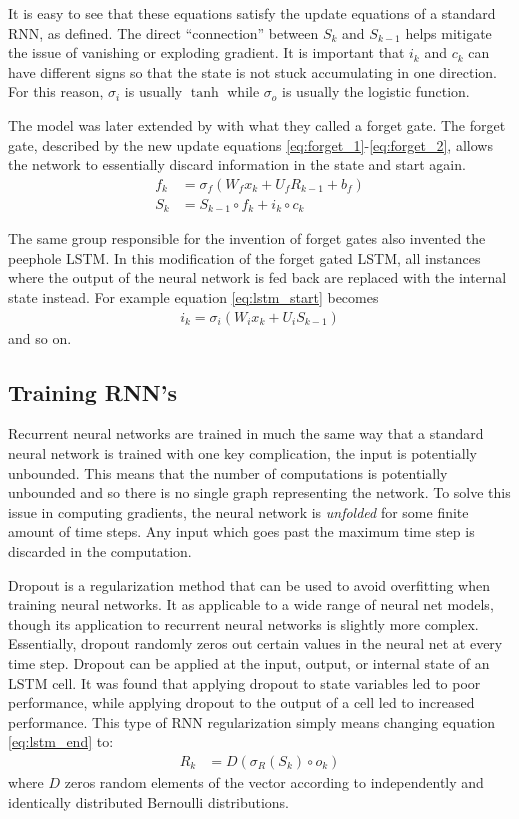 It is easy to see that these equations satisfy the update equations of a standard RNN, as defined.  The direct ``connection'' between $S_k$ and $S_{k-1}$ helps mitigate the issue of vanishing or exploding gradient.  It is important that $i_k$ and $c_k$ can have different signs so that the state is not stuck accumulating in one direction.  For this reason, $\sigma_i$ is usually $\tanh$ while $\sigma_o$ is usually the logistic function.

The model was later extended by \cite{fg00} with what they called a forget gate.  The forget gate, described by the new update equations \ref{eq:forget_1}-\ref{eq:forget_2}, allows the network to essentially discard information in the state and start again.
\begin{align}
f_k &= \sigma_f(W_fx_k + U_fR_{k-1} + b_f)\label{eq:forget_1}\\
S_k &= S_{k-1}\circ f_k + i_k \circ c_k\label{eq:forget_2}
\end{align}

The same group responsible for the invention of forget gates also invented the peephole LSTM. \cite{fg00_2} In this modification of the forget gated LSTM, all instances where the output of the neural network is fed back are replaced with the internal state instead.  For example equation \ref{eq:lstm_start} becomes 
\begin{align}\label{eq:peephole}
i_k = \sigma_i(W_ix_k + U_iS_{k-1})
\end{align}
and so on.

\subsection{Training RNN's}\label{sec:rnn_training}
Recurrent neural networks are trained in much the same way that a standard neural network is trained with one key complication, the input is potentially unbounded.  This means that the number of computations is potentially unbounded and so there is no single graph representing the network.  To solve this issue in computing gradients, the neural network is \emph{unfolded} for some finite amount of time steps.  Any input which goes past the maximum time step is discarded in the computation.

Dropout is a regularization method that can be used to avoid overfitting when training neural networks.  It as applicable to a wide range of neural net models, though its application to recurrent neural networks is slightly more complex.  Essentially, dropout randomly zeros out certain values in the neural net at every time step.  Dropout can be applied at the input, output, or internal state of an LSTM cell.  It was found that applying dropout to state variables led to poor performance, while applying dropout to the output of a cell led to increased performance. \cite{wz14} This type of RNN regularization simply means changing equation \ref{eq:lstm_end} to:
\begin{align}
R_k &= D(\sigma_R(S_k) \circ o_k)
\end{align}
where $D$ zeros random elements of the vector according to independently and identically distributed Bernoulli distributions.

